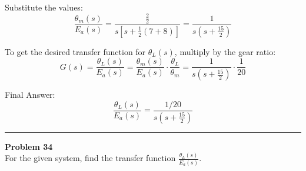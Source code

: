 \documentclass[11pt]{article}
\begin{document}
Substitute the values:
\[
\frac{\theta_m(s)}{E_a(s)} = \frac{\frac{2}{2}}{s\left[s + \frac{1}{2}(7 + 8)\right]}
= \frac{1}{s\left(s + \frac{15}{2}\right)}
\]

To get the desired transfer function for $\theta_L(s)$, multiply by the gear ratio:
\[
G(s) = \frac{\theta_L(s)}{E_a(s)} = \frac{\theta_m(s)}{E_a(s)} \cdot \frac{\theta_L}{\theta_m}
= \frac{1}{s\left(s + \frac{15}{2}\right)} \cdot \frac{1}{20}
\]

\vspace{5pt}
{Final Answer:}
\[
\boxed{
\frac{\theta_L(s)}{E_a(s)} = \frac{1/20}{s\left(s + \frac{15}{2}\right)}
}
\]



\newpage
  \setcounter{page}{66}  
\noindent\rule{\textwidth}{1pt}
\noindent\textbf{Problem 34} \hfill 
\\ For the given system, find the transfer function $\frac{\theta_L(s)}{E_a(s)}$.
\end{document}

